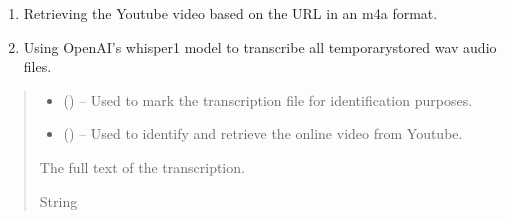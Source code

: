 \documentclass[letterpaper,10pt,english]{sphinxhowto}
\begin{document}
\begin{fulllineitems}
\label{\detokenize{_autosummary/custom_packages.preprocessing_modules.transcriber.transcribe_youtube_audio_from_videos:custom_packages.preprocessing_modules.transcriber.transcribe_youtube_audio_from_videos}}
\pysigstartsignatures
\pysiglinewithargsret
{}
{\sphinxparamcomma {}\sphinxparamcomma {}}
{}
\pysigstopsignatures\begin{enumerate}
%
\item {} 
\sphinxAtStartPar
Retrieving the Youtube video based on the URL in an m4a format.

\item {} 
\sphinxAtStartPar
Using OpenAI’s whisper\sphinxhyphen{}1 model to transcribe all temporary\sphinxhyphen{}stored wav audio files.

\end{enumerate}
\begin{quote}\begin{description}
\begin{itemize}
\item {} 
\sphinxAtStartPar
{} () – Used to mark the transcription file for identification purposes.

\item {} 
\sphinxAtStartPar
{} () – Used to identify and retrieve the online video from Youtube.

\end{itemize}

\sphinxAtStartPar
The full text of the transcription.

\sphinxAtStartPar
String

\end{description}\end{quote}

\end{fulllineitems}


\sphinxstepscope
\end{document}
